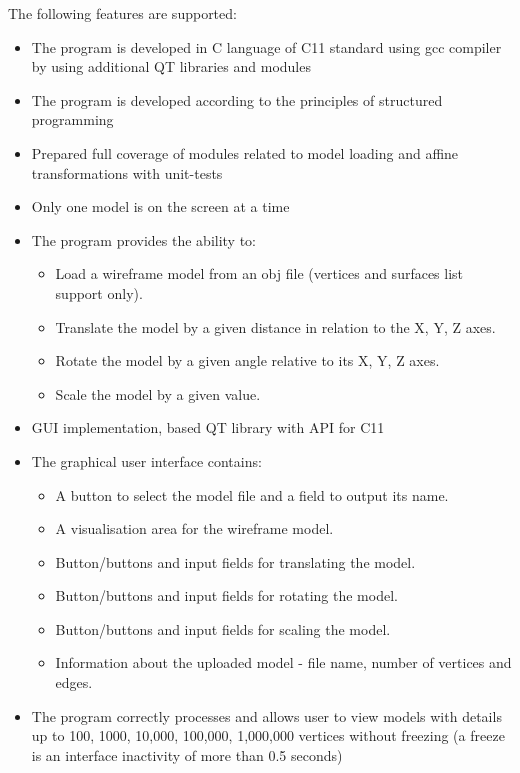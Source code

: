 \documentclass{article}
\begin{document}
The following features are supported:
  \begin{itemize}
    \item The program is developed in C language of C11 standard using gcc compiler by using additional QT libraries and modules
    \item The program is developed according to the principles of structured programming
    \item Prepared full coverage of modules related to model loading and affine transformations with unit-tests
    \item Only one model is on the screen at a time
    \item The program provides the ability to:
    \begin{itemize}
      \item Load a wireframe model from an obj file (vertices and surfaces list support only).
      \item Translate the model by a given distance in relation to the X, Y, Z axes.
      \item Rotate the model by a given angle relative to its X, Y, Z axes.
      \item Scale the model by a given value.
    \end{itemize}
  \item GUI implementation, based QT library with API for C11
  \item The graphical user interface contains:
  \begin{itemize}
      \item A button to select the model file and a field to output its name.
      \item A visualisation area for the wireframe model.
      \item Button/buttons and input fields for translating the model.
      \item Button/buttons and input fields for rotating the model.
      \item Button/buttons and input fields for scaling the model.
      \item Information about the uploaded model - file name, number of vertices and edges.
      \end{itemize}
  \item The program correctly processes and allows user to view models with details up to 100, 1000, 10,000, 100,000, 1,000,000  vertices without freezing (a freeze is an interface inactivity of more than 0.5 seconds)
  \end{itemize}
\end{document}
